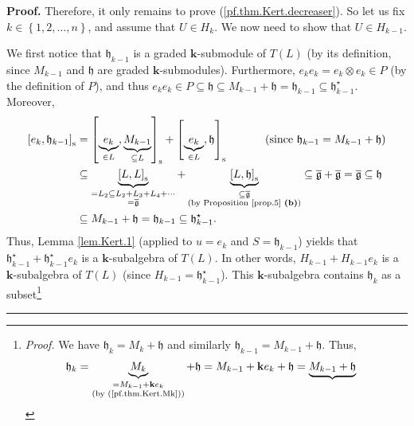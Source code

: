 \documentclass[numbers=enddot,12pt,final,onecolumn,notitlepage]{scrartcl}%
\theoremstyle{definition}
\newenvironment{proof}[1][Proof]{\noindent\textbf{#1.} }{\ \rule{0.5em}{0.5em}}
\begin{document}
\begin{proof}
Therefore, it only remains to prove (\ref{pf.thm.Kert.decreaser}). So let us
fix $k\in\left\{  1,2,\ldots,n\right\}  $, and assume that $U\in H_{k}$. We
now need to show that $U\in H_{k-1}$.

We first notice that $\mathfrak{h}_{k-1}$ is a graded $\mathbf{k}$-submodule
of $T\left(  L\right)  $ (by its definition, since $M_{k-1}$ and
$\mathfrak{h}$ are graded $\mathbf{k}$-submodules). Furthermore, $e_{k}%
e_{k}=e_{k}\otimes e_{k}\in P$ (by the definition of $P$), and thus
$e_{k}e_{k}\in P\subseteq\mathfrak{h}\subseteq M_{k-1}+\mathfrak{h}%
=\mathfrak{h}_{k-1}\subseteq\mathfrak{h}_{k-1}^{\star}$. Moreover,%
\begin{align*}
\left[  e_{k},\mathfrak{h}_{k-1}\right]  _{\operatorname*{s}}  &  =\left[
\underbrace{e_{k}}_{\in L},\underbrace{M_{k-1}}_{\subseteq L}\right]
_{\operatorname*{s}}+\left[  \underbrace{e_{k}}_{\in L},\mathfrak{h}\right]
_{\operatorname*{s}}\ \ \ \ \ \ \ \ \ \ \left(  \text{since }\mathfrak{h}%
_{k-1}=M_{k-1}+\mathfrak{h}\right) \\
&  \subseteq\underbrace{\left[  L,L\right]  _{\operatorname*{s}}%
}_{\substack{=L_{2}\subseteq L_{2}+L_{3}+L_{4}+\cdots\\=\overline
{\mathfrak{g}}}}+\underbrace{\left[  L,\mathfrak{h}\right]
_{\operatorname*{s}}}_{\substack{\subseteq\overline{\mathfrak{g}}\\\text{(by
Proposition \ref{prop.5} \textbf{(b)})}}}\subseteq\overline{\mathfrak{g}%
}+\overline{\mathfrak{g}}=\overline{\mathfrak{g}}\subseteq\mathfrak{h}\\
&  \subseteq M_{k-1}+\mathfrak{h}=\mathfrak{h}_{k-1}\subseteq\mathfrak{h}%
_{k-1}^{\star}.
\end{align*}
Thus, Lemma \ref{lem.Kert.1} (applied to $u=e_{k}$ and $S=\mathfrak{h}_{k-1}$)
yields that $\mathfrak{h}_{k-1}^{\star}+\mathfrak{h}_{k-1}^{\star}e_{k}$ is a
$\mathbf{k}$-subalgebra of $T\left(  L\right)  $. In other words,
$H_{k-1}+H_{k-1}e_{k}$ is a $\mathbf{k}$-subalgebra of $T\left(  L\right)  $
(since $H_{k-1}=\mathfrak{h}_{k-1}^{\star}$). This $\mathbf{k}$-subalgebra
contains $\mathfrak{h}_{k}$ as a subset\footnote{\textit{Proof.} We have
$\mathfrak{h}_{k}=M_{k}+\mathfrak{h}$ and similarly $\mathfrak{h}%
_{k-1}=M_{k-1}+\mathfrak{h}$. Thus,%
\begin{align*}
\mathfrak{h}_{k}  &  =\underbrace{M_{k}}_{\substack{=M_{k-1}+\mathbf{k}%
e_{k}\\\text{(by (\ref{pf.thm.Kert.Mk}))}}}+\mathfrak{h}=M_{k-1}%
+\mathbf{k}e_{k}+\mathfrak{h}=\underbrace{M_{k-1}+\mathfrak{h}}%

\end{align*}}
\end{proof}
\end{document}
